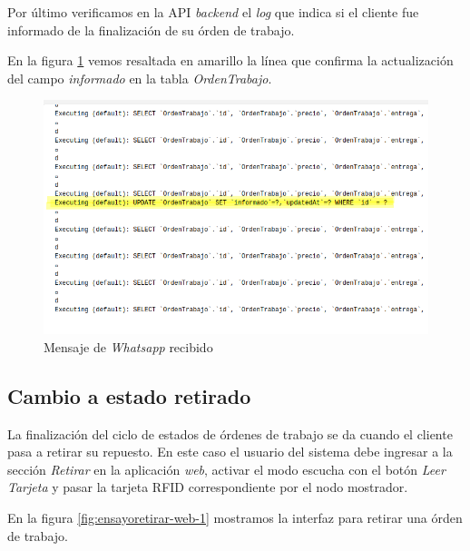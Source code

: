 Por último verificamos en la API \textit{backend} el \textit{log} que indica si el cliente fue informado de la finalización de su órden de trabajo.

En la figura \ref{fig:ensayomensajeapilog} vemos resaltada en amarillo la línea que confirma la actualización del campo \textit{informado} en la tabla \textit{OrdenTrabajo}.

\begin{figure}[H]
	\centering
	\includegraphics[scale=.50]{./Figures/ensayo-1/20.mensaje-api-log.png}
	\caption{Mensaje de \textit{Whatsapp} recibido}
	\label{fig:ensayomensajeapilog}
\end{figure}


\subsection{Cambio a estado retirado}
\label{subsec:ensayoretiro}

La finalización del ciclo de estados de órdenes de trabajo se da cuando el cliente pasa a retirar su repuesto. En este caso el usuario del sistema debe ingresar a la sección \textit{Retirar} en la aplicación \textit{web}, activar el modo escucha con el botón \textit{Leer Tarjeta} y pasar la tarjeta RFID correspondiente por el nodo mostrador.

En la figura \ref{fig:ensayoretirar-web-1} mostramos la interfaz para retirar una órden de trabajo.

